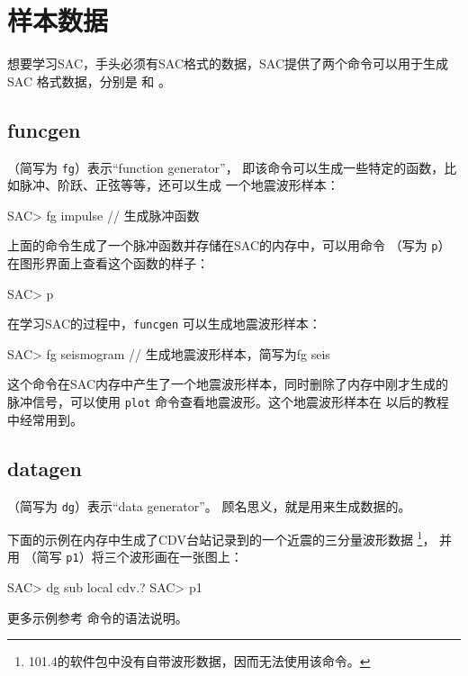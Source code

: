 \section{样本数据}
想要学习SAC，手头必须有SAC格式的数据，SAC提供了两个命令可以用于生成SAC
格式数据，分别是  和 。

\subsection{funcgen}
（简写为 \texttt{fg}）表示``function generator''，
即该命令可以生成一些特定的函数，比如脉冲、阶跃、正弦等等，还可以生成
一个地震波形样本：
\begin{SACCode}
SAC> fg impulse         // 生成脉冲函数
\end{SACCode}
上面的命令生成了一个脉冲函数并存储在SAC的内存中，可以用命令
（写为 \texttt{p}）在图形界面上查看这个函数的样子：
\begin{SACCode}
SAC> p
\end{SACCode}

在学习SAC的过程中，\texttt{funcgen} 可以生成地震波形样本：
\begin{SACCode}
SAC> fg seismogram      // 生成地震波形样本，简写为fg seis
\end{SACCode}
这个命令在SAC内存中产生了一个地震波形样本，同时删除了内存中刚才生成的
脉冲信号，可以使用 \texttt{plot} 命令查看地震波形。这个地震波形样本在
以后的教程中经常用到。

\subsection{datagen}
（简写为 \texttt{dg}）表示``data generator''。
顾名思义，就是用来生成数据的。

下面的示例在内存中生成了CDV台站记录到的一个近震的三分量波形数据
\footnote{101.4的软件包中没有自带波形数据，因而无法使用该命令。}，
并用 （简写 \texttt{p1}）将三个波形画在一张图上：
\begin{SACCode}
SAC> dg sub local cdv.?
SAC> p1
\end{SACCode}
更多示例参考  命令的语法说明。
